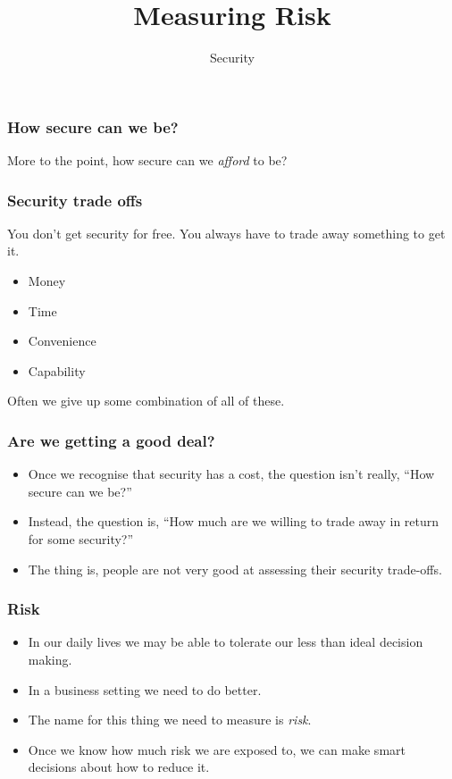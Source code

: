 \documentclass[10pt]{beamer}
\title{Measuring Risk}
\author[IN618]{Security}
\institute[Otago Polytechnic]{
  Otago Polytechnic \\
  Dunedin, New Zealand \\
}
\date{}
\begin{document}
\begin{frame}[plain]
  \titlepage
\end{frame}


\begin{frame}
	\frametitle{How secure can we be?}
	
	More to the point, how secure can we \emph{afford} to be?
	
\end{frame}

\begin{frame}
	\frametitle{Security trade offs}

	You don't get security for free.  You always
	have to trade away something to get it.

	\begin{itemize}
		\item Money
		\item Time
		\item Convenience
		\item Capability
	\end{itemize}

	Often we give up some combination of all of these.
\end{frame}

\begin{frame}
	\frametitle{Are we getting a good deal?}

	\begin{itemize}
		\item Once we recognise that security has a cost,
			the question isn't really, ``How secure 
			can we be?''
		\item Instead, the question is, ``How much are
			we willing to trade away in return for 
			some security?''
		\item The thing is, people are not very good at 
			assessing their security trade-offs.
	\end{itemize}
\end{frame}

\begin{frame}
	\frametitle{Risk}

	\begin{itemize}
		\item In our daily lives we may be able to 
			tolerate our less than ideal decision making.
		\item In a business setting we need to do better.
		\item The name for this thing we need to measure is \emph{risk}.
		\item Once we know how much risk we are exposed to, we can make smart
		decisions about how to reduce it.
	\end{itemize}
\end{frame}
\end{document}
